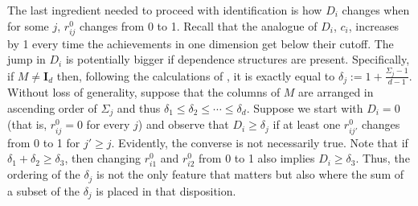 \documentclass[english, a4paper,12pt]{article}
\begin{document}
The last ingredient needed to proceed with identification is how $D_{i}$ changes when for some $j$, $r_{ij}^{0}$ changes from 0 to 1. Recall that the analogue of $D_{i}$, $c_{i}$, increases by 1 every time the achievements in one dimension get below their cutoff. The jump in $D_{i}$ is potentially bigger if dependence structures are present. Specifically, if $M \neq \mathbf{I}_{d}$ then, following the calculations of , it is exactly equal to $\delta_{j} := 1 + \frac{\Sigma_{j} - 1}{d-1}$. Without loss of generality, suppose that the columns of $M$ are arranged in ascending order of $\Sigma_{j}$ and thus $\delta_{1} \leq \delta_{2} \leq \cdots \leq \delta_{d}$. Suppose we start with $D_{i} = 0$ (that is, $r_{ij}^{0} = 0$ for every $j$) and observe that $D_{i} \geq \delta_{j}$ if at least one $r_{ij'}^{0}$ changes from 0 to 1 for $j' \geq j$. Evidently, the converse is not necessarily true. Note that if $\delta_{1} + \delta_{2} \geq \delta_{3}$, then changing $r_{i1}^{0}$ and $r_{i2}^{0}$ from 0 to 1 also implies $D_{i} \geq \delta_{3}$. Thus, the ordering of the $\delta_{j}$ is not the only feature that matters but also where the sum of a subset of the $\delta_{j}$ is placed in that disposition.
\end{document}
